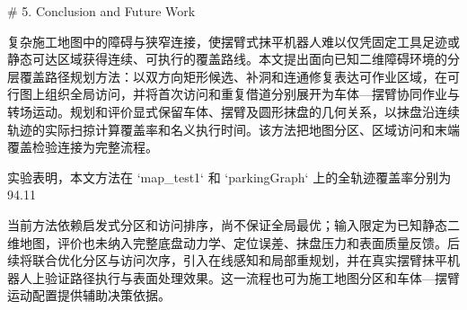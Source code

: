 # 5. Conclusion and Future Work

  

复杂施工地图中的障碍与狭窄连接，使摆臂式抹平机器人难以仅凭固定工具足迹或静态可达区域获得连续、可执行的覆盖路线。本文提出面向已知二维障碍环境的分层覆盖路径规划方法：以双方向矩形候选、补洞和连通修复表达可作业区域，在可行图上组织全局访问，并将首次访问和重复借道分别展开为车体—摆臂协同作业与转场运动。规划和评价显式保留车体、摆臂及圆形抹盘的几何关系，以抹盘沿连续轨迹的实际扫掠计算覆盖率和名义执行时间。该方法把地图分区、区域访问和末端覆盖检验连接为完整流程。

实验表明，本文方法在 `map_test1` 和 `parkingGraph` 上的全轨迹覆盖率分别为 94.11%

当前方法依赖启发式分区和访问排序，尚不保证全局最优；输入限定为已知静态二维地图，评价也未纳入完整底盘动力学、定位误差、抹盘压力和表面质量反馈。后续将联合优化分区与访问次序，引入在线感知和局部重规划，并在真实摆臂抹平机器人上验证路径执行与表面处理效果。这一流程也可为施工地图分区和车体—摆臂运动配置提供辅助决策依据。
